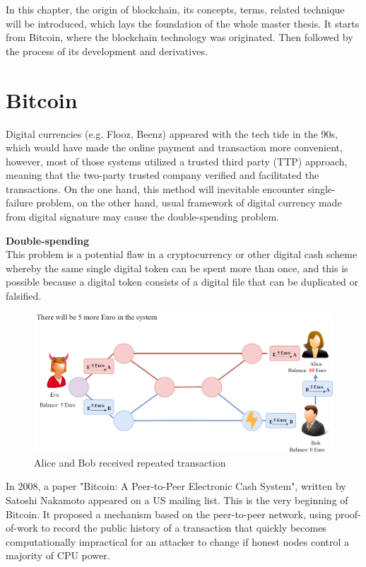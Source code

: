 In this chapter, the origin of blockchain, its concepts, terms, related technique will be introduced, which lays the foundation of the whole master thesis. It starts from Bitcoin, where the blockchain technology was originated. Then followed by the process of its development and derivatives.

\section{Bitcoin}
Digital currencies (e.g. Flooz, Beenz) appeared with the tech tide in the 90s, which would have made the online payment and transaction more convenient,
however, most of those systems utilized a trusted third party (TTP) approach, meaning that the two-party trusted company verified and facilitated the transactions. On the one hand, this method will inevitable encounter single-failure problem, on the other hand, usual framework of digital currency made from digital signature may cause the double-spending problem. 

\textbf{Double-spending} \\
This problem is a potential flaw in a cryptocurrency or other digital cash scheme whereby the same single digital token can be spent more than once, and this is possible because a digital token consists of a digital file that can be duplicated or falsified.
\cite{DoubleSpend} 
\begin{figure}[H]%
	\includegraphics[width=\textwidth]{charts/DoubleSpend}
	\caption{Alice and Bob received repeated transaction }
\end{figure}

In 2008, a paper "Bitcoin: A Peer-to-Peer Electronic Cash System", written by Satoshi Nakamoto appeared on a US mailing list. This is the very beginning of Bitcoin. It proposed a mechanism based on the peer-to-peer network, using proof-of-work to record the public history of a transaction
that quickly becomes computationally impractical for an attacker to change if honest nodes control a majority of CPU power.

